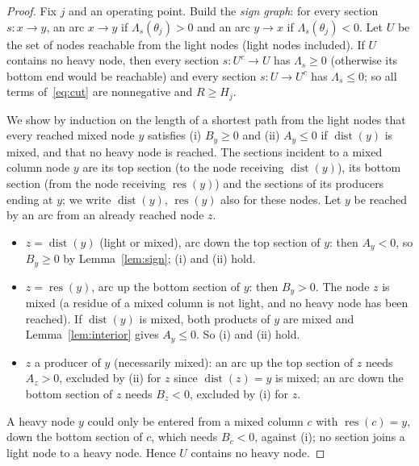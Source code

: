 \documentclass[11pt,a4paper]{report}
\newcommand{\Lam}{\Lambda}
\newcommand{\dist}{\operatorname{dist}}
\newcommand{\res}{\operatorname{res}}
\begin{document}
\begin{proof}
Fix $j$ and an operating point. Build the \emph{sign graph}: for every section $s\colon x\to y$, an arc $x\to y$ if
$\Lam_s(\theta_j)>0$ and an arc $y\to x$ if $\Lam_s(\theta_j)<0$. Let $U$ be the set of nodes reachable from the light
nodes (light nodes included). If $U$ contains no heavy node, then every section $s\colon U^c\to U$ has
$\Lam_s\ge0$ (otherwise its bottom end would be reachable) and every section $s\colon U\to U^c$ has $\Lam_s\le0$; so all
terms of~\eqref{eq:cut} are nonnegative and $R\ge H_j$.

We show by induction on the length of a shortest path from the light nodes that every reached mixed node $y$
satisfies (i) $B_y\ge0$ and (ii) $A_y\le0$ if $\dist(y)$ is mixed, and that no heavy node is reached. The sections
incident to a mixed column node $y$ are its top section (to the node receiving $\dist(y)$), its bottom section (from
the node receiving $\res(y)$) and the sections of its producers ending at $y$; we write $\dist(y)$, $\res(y)$ also for
these nodes. Let $y$ be reached by an arc from an already reached node $z$.
\begin{itemize}
\item $z=\dist(y)$ (light or mixed), arc down the top section of $y$: then $A_y<0$, so $B_y\ge0$ by
Lemma~\ref{lem:sign}; (i) and (ii) hold.
\item $z=\res(y)$, arc up the bottom section of $y$: then $B_y>0$. The node $z$ is mixed (a residue of a mixed column
is not light, and no heavy node has been reached). If $\dist(y)$ is mixed, both products of $y$ are mixed and
Lemma~\ref{lem:interior} gives $A_y\le0$. So (i) and (ii) hold.
\item $z$ a producer of $y$ (necessarily mixed): an arc up the top section of $z$ needs $A_z>0$, excluded by (ii) for
$z$ since $\dist(z)=y$ is mixed; an arc down the bottom section of $z$ needs $B_z<0$, excluded by (i) for $z$.
\end{itemize}
A heavy node $y$ could only be entered from a mixed column $c$ with $\res(c)=y$, down the bottom section of $c$, which
needs $B_c<0$, against (i); no section joins a light node to a heavy node. Hence $U$ contains no heavy node.
\end{proof}
\end{document}
